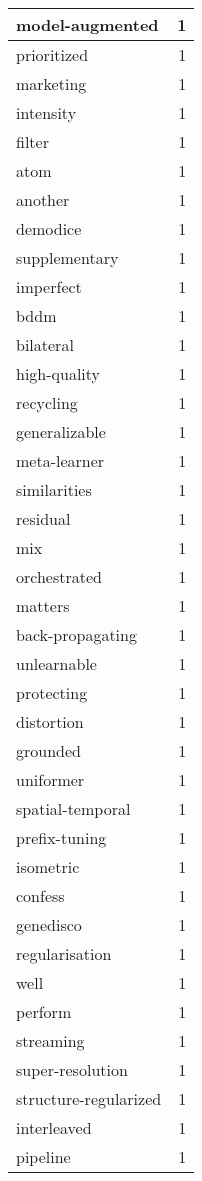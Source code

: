 \begin{table}[h]
\begin{tabular}{|l|r|}
\hline
model-augmented & 1 \\
\hline
prioritized & 1 \\
\hline
marketing & 1 \\
\hline
intensity & 1 \\
\hline
filter & 1 \\
\hline
atom & 1 \\
\hline
another & 1 \\
\hline
demodice & 1 \\
\hline
supplementary & 1 \\
\hline
imperfect & 1 \\
\hline
bddm & 1 \\
\hline
bilateral & 1 \\
\hline
high-quality & 1 \\
\hline
recycling & 1 \\
\hline
generalizable & 1 \\
\hline
meta-learner & 1 \\
\hline
similarities & 1 \\
\hline
residual & 1 \\
\hline
mix & 1 \\
\hline
orchestrated & 1 \\
\hline
matters & 1 \\
\hline
back-propagating & 1 \\
\hline
unlearnable & 1 \\
\hline
protecting & 1 \\
\hline
distortion & 1 \\
\hline
grounded & 1 \\
\hline
uniformer & 1 \\
\hline
spatial-temporal & 1 \\
\hline
prefix-tuning & 1 \\
\hline
isometric & 1 \\
\hline
confess & 1 \\
\hline
genedisco & 1 \\
\hline
regularisation & 1 \\
\hline
well & 1 \\
\hline
perform & 1 \\
\hline
streaming & 1 \\
\hline
super-resolution & 1 \\
\hline
structure-regularized & 1 \\
\hline
interleaved & 1 \\
\hline
pipeline & 1 \\

\end{tabular}
\end{table}
